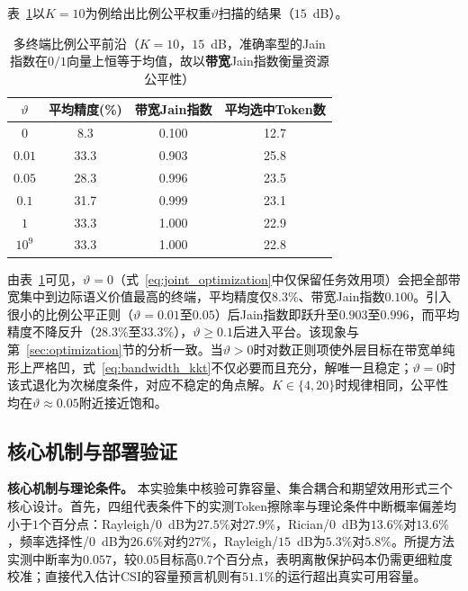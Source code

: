 \documentclass[journal]{IEEEtran}
\begin{document}
表~\ref{tab:multiterminal}以$K=10$为例给出比例公平权重$\vartheta$扫描的结果（$15$~dB）。

\begin{table}[t]
\centering
\caption{多终端比例公平前沿（$K=10$，$15$~dB，准确率型的Jain指数在$0/1$向量上恒等于均值，故以\textbf{带宽}Jain指数衡量资源公平性）}
\label{tab:multiterminal}
\renewcommand{\arraystretch}{1.05}
\begin{tabular}{cccc}
\hline
$\vartheta$ & 平均精度(\%) & 带宽Jain指数 & 平均选中Token数\\
\hline
$0$ & 8.3 & 0.100 & 12.7\\
$0.01$ & 33.3 & 0.903 & 25.8\\
$0.05$ & 28.3 & 0.996 & 23.5\\
$0.1$ & 31.7 & 0.999 & 23.1\\
$1$ & 33.3 & 1.000 & 22.9\\
$10^{9}$ & 33.3 & 1.000 & 22.8\\
\hline
\end{tabular}
\end{table}

由表~\ref{tab:multiterminal}可见，$\vartheta=0$（式~\eqref{eq:joint_optimization}中仅保留任务效用项）会把全部带宽集中到边际语义价值最高的终端，平均精度仅$8.3\%$、带宽Jain指数$0.100$。引入很小的比例公平正则（$\vartheta=0.01$至$0.05$）后Jain指数即跃升至$0.903$至$0.996$，而平均精度不降反升（$28.3\%$至$33.3\%$），$\vartheta\geq0.1$后进入平台。该现象与第~\ref{sec:optimization}节的分析一致。当$\vartheta>0$时对数正则项使外层目标在带宽单纯形上严格凹，式~\eqref{eq:bandwidth_kkt}不仅必要而且充分，解唯一且稳定；$\vartheta=0$时该式退化为次梯度条件，对应不稳定的角点解。$K\in\{4,20\}$时规律相同，公平性均在$\vartheta\approx0.05$附近接近饱和。

\subsection{核心机制与部署验证}
\label{sec:exp-f}

\textbf{核心机制与理论条件。}
\label{sec:exp-d}
本实验集中核验可靠容量、集合耦合和期望效用形式三个核心设计。首先，四组代表条件下的实测Token擦除率与理论条件中断概率偏差均小于$1$个百分点：Rayleigh/$0$~dB为$27.5\%$对$27.9\%$，Rician/$0$~dB为$13.6\%$对$13.6\%$，频率选择性/$0$~dB为$26.6\%$对约$27\%$，Rayleigh/$15$~dB为$5.3\%$对$5.8\%$。所提方法实测中断率为$0.057$，较$0.05$目标高$0.7$个百分点，表明离散保护码本仍需更细粒度校准；直接代入估计CSI的容量预言机则有$51.1\%$的运行超出真实可用容量。
\end{document}
